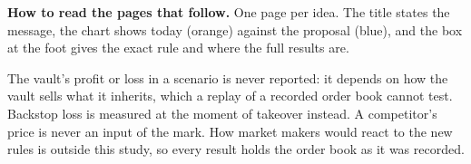 \documentclass[10.5pt,a4paper]{article}
\begin{document}
\vspace{1ex}
\textbf{How to read the pages that follow.} One page per idea. The title states the message, the chart shows today (orange) against the proposal (blue), and the box at the foot gives the exact rule and where the full results are.

\vfill
\begin{exact}
The vault's profit or loss in a scenario is never reported: it depends on how the vault sells what it inherits, which a replay of a recorded order book cannot test. Backstop loss is measured at the moment of takeover instead. A competitor's price is never an input of the mark. How market makers would react to the new rules is outside this study, so every result holds the order book as it was recorded.
\end{exact}
\end{document}
